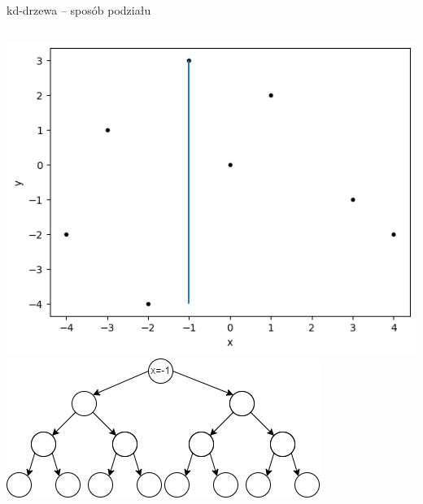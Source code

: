 \documentclass[aspectratio=169,dvipsnames]{beamer}
\begin{document}
\begin{frame}{kd-drzewa -- sposób podziału}
    \begin{columns}
        \includegraphics[width=\textwidth]{images/plots/2}
        \includegraphics[width=\textwidth]{images/trees/2.drawio}
    \end{columns}
\end{frame}
\end{document}
